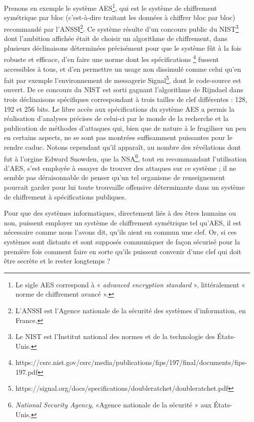 Prenons en exemple le système AES\footnote{Le sigle AES correspond à « {\it advanced encryption
standard} », littéralement « norme de chiffrement avancé ».}, qui est le système de chiffrement
symétrique par bloc (c’est-à-dire traitant les données à chiffrer bloc par bloc) recommandé par
l’ANSSI\footnote{L’ANSSI est l’Agence nationale de la sécurité des systèmes d’information, en
France.}.
Ce système résulte d’un concours public du NIST\footnote{Le NIST est l’Institut national des normes
et de la technologie des États-Unis.} dont l’ambition affichée était de choisir un algorithme de
chiffrement, dans plusieurs déclinaisons déterminées précisément pour que le système fût à la fois
robuste et efficace, d’en faire une norme dont les spécifications%
\footnote{https://csrc.nist.gov/csrc/media/publications/fips/197/final/documents/fips-197.pdf}
fussent accessibles à tous, et d’en permettre un usage non dissimulé comme celui qu’en fait par
exemple l’environnement de messagerie
Signal\footnote{https://signal.org/docs/specifications/doubleratchet/doubleratchet.pdf}, dont le
code-source est ouvert.
De ce concours du NIST est sorti gagnant l’algorithme de Rijndael dans trois déclinaisons
spécifiques correspondant à trois tailles de clef différentes : 128, 192 et 256 bits. 
Le libre accès aux spécifications du système AES a permis la réalisation d’analyses précises de
celui-ci par le monde de la recherche et la publication de méthodes d’attaques qui, bien que de
nature à le fragiliser un peu en certains aspects, ne se sont pas montrées suffisamment
puissantes pour le rendre caduc.
Notons cependant qu’il apparaît, au nombre des révélations dont fut à l’orgine Edward Snowden, que
la NSA\footnote{{\it National Security Agency}, «Agence nationale de la sécurité » aux États-Unis.},
tout en recommandant l’utilisation d’AES, s’est employée à essayer de trouver des attaques sur ce
système ; il ne semble pas déraisonnable de penser qu’un tel organisme de renseignement pourrait
garder pour lui toute trouvaille offensive déterminante dans un système de chiffrement à
spécifications publiques.

Pour que des systèmes informatiques, directement liés à des êtres humains ou non, puissent
employer un système de chiffrement symétrique tel qu’AES, il est nécessaire comme nous l’avons dit,
qu’ils aient en commun une clef.
Or, si ces systèmes sont distants et sont supposés communiquer de façon sécurisé pour la première
fois comment faire en sorte qu’ils puissent convenir d’une clef qui doit être secrète et le rester
longtemps ?

